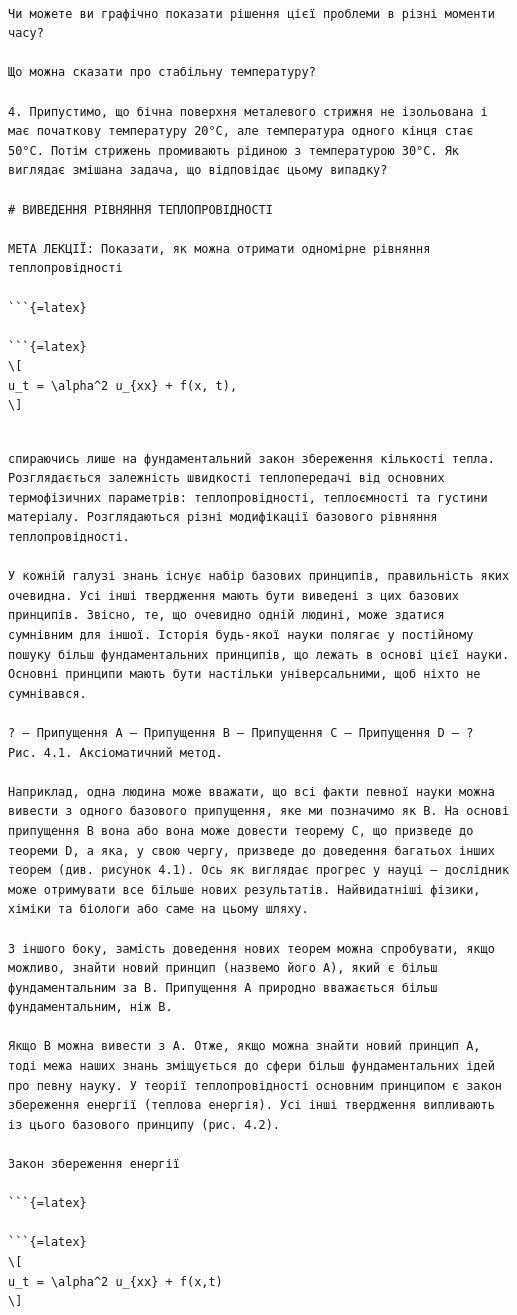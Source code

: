 \documentclass[
  ukrainian,
]{article}
\begin{document}
\begin{verbatim}

Чи можете ви графічно показати рішення цієї проблеми в різні моменти часу?

Що можна сказати про стабільну температуру?

4. Припустимо, що бічна поверхня металевого стрижня не ізольована і має початкову температуру 20°C, але температура одного кінця стає 50°C. Потім стрижень промивають рідиною з температурою 30°C. Як виглядає змішана задача, що відповідає цьому випадку?

# ВИВЕДЕННЯ РІВНЯННЯ ТЕПЛОПРОВІДНОСТІ

МЕТА ЛЕКЦІЇ: Показати, як можна отримати одномірне рівняння теплопровідності

```{=latex}

```{=latex}
\[
u_t = \alpha^2 u_{xx} + f(x, t),
\]
\end{verbatim}

\begin{verbatim}

спираючись лише на фундаментальний закон збереження кількості тепла. Розглядається залежність швидкості теплопередачі від основних термофізичних параметрів: теплопровідності, теплоємності та густини матеріалу. Розглядаються різні модифікації базового рівняння теплопровідності.

У кожній галузі знань існує набір базових принципів, правильність яких очевидна. Усі інші твердження мають бути виведені з цих базових принципів. Звісно, те, що очевидно одній людині, може здатися сумнівним для іншої. Історія будь-якої науки полягає у постійному пошуку більш фундаментальних принципів, що лежать в основі цієї науки. Основні принципи мають бути настільки універсальними, щоб ніхто не сумнівався.

? — Припущення A — Припущення B — Припущення C — Припущення D — ?
Рис. 4.1. Аксіоматичний метод.

Наприклад, одна людина може вважати, що всі факти певної науки можна вивести з одного базового припущення, яке ми позначимо як B. На основі припущення B вона або вона може довести теорему C, що призведе до теореми D, а яка, у свою чергу, призведе до доведення багатьох інших теорем (див. рисунок 4.1). Ось як виглядає прогрес у науці — дослідник може отримувати все більше нових результатів. Найвидатніші фізики, хіміки та біологи або саме на цьому шляху.

З іншого боку, замість доведення нових теорем можна спробувати, якщо можливо, знайти новий принцип (назвемо його A), який є більш фундаментальним за B. Припущення A природно вважається більш фундаментальним, ніж B.

Якщо B можна вивести з A. Отже, якщо можна знайти новий принцип A, тоді межа наших знань зміщується до сфери більш фундаментальних ідей про певну науку. У теорії теплопровідності основним принципом є закон збереження енергії (теплова енергія). Усі інші твердження випливають із цього базового принципу (рис. 4.2).

Закон збереження енергії

```{=latex}

```{=latex}
\[
u_t = \alpha^2 u_{xx} + f(x,t)
\]
\end{verbatim}
\end{document}
